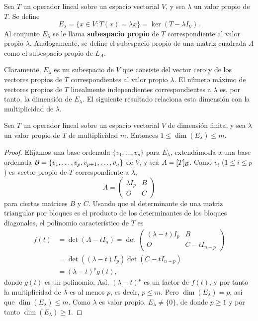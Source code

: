 \documentclass[12pt,a4paper]{book}
\begin{document}
    \begin{definicion}
        Sea $T$ un operador lineal sobre un espacio vectorial $V$, y sea $\lambda$ un valor propio de $T$. Se define
        \begin{equation*}
            E_\lambda=\{x\in V: T(x)=\lambda x\}=\ker(T-\lambda I_V).
        \end{equation*}
        Al conjunto $E_\lambda$ se le llama \textbf{subespacio propio} de $T$ correspondiente al valor propio $\lambda$. Análogamente, se define el subespacio propio de una matriz cuadrada $A$ como el subespacio propio de $L_A$.
    \end{definicion}

    Claramente, $E_\lambda$ es un subespacio de $V$ que consiste del vector cero y de los vectores propios de $T$ correspondientes al valor propio $\lambda$. El número máximo de vectores propios de $T$ linealmente independientes correspondientes a $\lambda$ es, por tanto, la dimensión de $E_\lambda$. El siguiente resultado relaciona esta dimensión con la multiplicidad de $\lambda$.

    \begin{teorema}
        Sea $T$ un operador lineal sobre un espacio vectorial $V$ de dimensión finita, y sea $\lambda$ un valor propio de $T$ de multiplicidad $m$. Entonces $1\leq \dim(E_\lambda)\leq m$.
    \end{teorema}

    \begin{proof}
        Elijamos una base ordenada $\{v_1,\dots,v_p\}$ para $E_\lambda$, extendámosla a una base ordenada $\mathcal{B}=\{v_1,\dots,v_p,v_{p+1},\dots,v_n\}$ de $V$, y sea $A=[T]_{\mathcal{B}}$. Como $v_i$ ($1\leq i\leq p$) es vector propio de $T$ correspondiente a $\lambda$,
        \begin{equation*}
            A=\begin{pmatrix}\lambda I_p&B\\O&C\end{pmatrix}
        \end{equation*}
        para ciertas matrices $B$ y $C$. Usando que el determinante de una matriz triangular por bloques es el producto de los determinantes de los bloques diagonales, el polinomio característico de $T$ es
        \begin{align*}
            f(t)&=\det(A-tI_n)=\det\begin{pmatrix}(\lambda-t)I_p&B\\O&C-tI_{n-p}\end{pmatrix}\\
            &=\det((\lambda-t)I_p)\det(C-tI_{n-p})\\
            &=(\lambda-t)^p g(t),
        \end{align*}
        donde $g(t)$ es un polinomio. Así, $(\lambda-t)^p$ es un factor de $f(t)$, y por tanto la multiplicidad de $\lambda$ es al menos $p$, es decir, $p\leq m$. Pero $\dim(E_\lambda)=p$, así que $\dim(E_\lambda)\leq m$. Como $\lambda$ es valor propio, $E_\lambda\neq\{0\}$, de donde $p\geq 1$ y por tanto $\dim(E_\lambda)\geq 1$.
    \end{proof}
\end{document}
